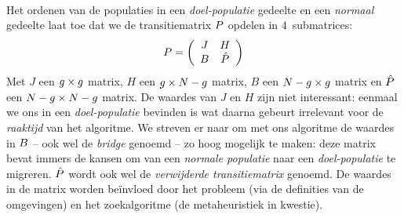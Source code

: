 \paragraph{}
Het ordenen van de populaties in een \emph{doel-populatie} gedeelte en een \emph{normaal} gedeelte laat toe dat we de transitiematrix $P$ opdelen in $4$~submatrices:
\begin{equation}
P=\left(\begin{array}{cc}
J&H\\
B&\hat{P}
\end{array}\right)
\end{equation}
Met $J$ een $g\times g$ matrix, $H$ een $g\times N-g$ matrix, $B$ een $N-g\times g$ matrix en $\hat{P}$ een $N-g\times N-g$ matrix. De waardes van $J$ en $H$ zijn niet interessant: eenmaal we ons in een \emph{doel-populatie} bevinden is wat daarna gebeurt irrelevant voor de \emph{raaktijd} van het algoritme. We streven er naar om met ons algoritme de waardes in $B$ -- ook wel de \emph{bridge} genoemd -- zo hoog mogelijk te maken: deze matrix bevat immers de kansen om van een \emph{normale populatie} naar een \emph{doel-populatie} te migreren. $\hat{P}$ wordt ook wel de \emph{verwijderde transitiematrix} genoemd. De waardes in de matrix worden be\"invloed door het probleem (via de definities van de omgevingen) en het zoekalgoritme (de metaheuristiek in kwestie).
